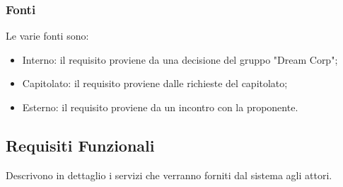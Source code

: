     
    \subsubsection{Fonti}
    Le varie fonti sono:
        \begin{itemize}
            \item Interno: il requisito proviene da una decisione del gruppo "Dream Corp";
            \item Capitolato: il requisito proviene dalle richieste del capitolato;
            \item Esterno: il requisito proviene da un incontro con la proponente.
        \end{itemize}
    
		\subsection{Requisiti Funzionali}			
        Descrivono in dettaglio i servizi che verranno forniti dal sistema agli attori.
